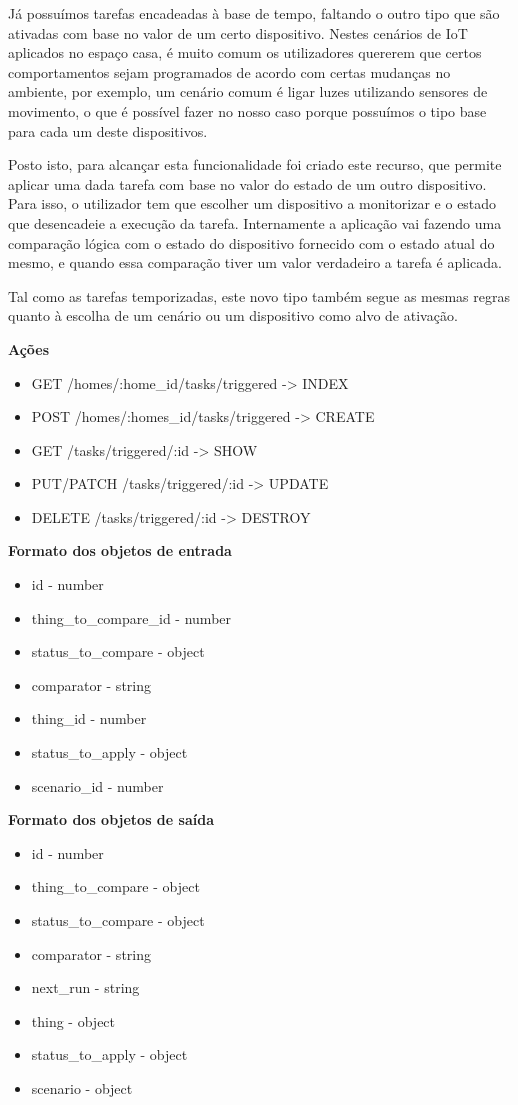 Já possuímos tarefas encadeadas à base de tempo, faltando o outro tipo que são ativadas com base no valor de um certo dispositivo. Nestes cenários de IoT aplicados no espaço casa, é muito comum os utilizadores quererem que certos comportamentos sejam programados de acordo com certas mudanças no ambiente, por exemplo, um cenário comum é ligar luzes utilizando sensores de movimento, o que é possível fazer no nosso caso porque possuímos o tipo base para cada um deste dispositivos.

Posto isto, para alcançar esta funcionalidade foi criado este recurso, que permite aplicar uma dada tarefa com base no valor do estado de um outro dispositivo. Para isso, o utilizador tem que escolher um dispositivo a monitorizar e o estado que desencadeie a execução da tarefa. Internamente a aplicação vai fazendo uma comparação lógica com o estado do dispositivo fornecido com o estado atual do mesmo, e quando essa comparação tiver um valor verdadeiro a tarefa é aplicada.

Tal como as tarefas temporizadas, este novo tipo também segue as mesmas regras quanto à escolha de um cenário ou um dispositivo como alvo de ativação.

\textbf{Ações}
\begin{itemize}
    \item GET /homes/:home{\_}id/tasks/triggered -> INDEX
    \item POST /homes/:homes{\_}id/tasks/triggered -> CREATE
    \item GET /tasks/triggered/:id -> SHOW
    \item PUT/PATCH /tasks/triggered/:id -> UPDATE
    \item DELETE /tasks/triggered/:id -> DESTROY
\end{itemize}

\textbf{Formato dos objetos de entrada}
\begin{itemize}
    \item id - number
    \item thing{\_}to{\_}compare{\_}id - number
    \item status{\_}to{\_}compare - object
    \item comparator - string
    \item thing{\_}id - number
    \item status{\_}to{\_}apply - object
    \item scenario{\_}id - number
\end{itemize}

\textbf{Formato dos objetos de saída}
\begin{itemize}
    \item id - number
    \item thing{\_}to{\_}compare - object
    \item status{\_}to{\_}compare - object
    \item comparator - string
    \item next{\_}run - string
    \item thing - object
    \item status{\_}to{\_}apply - object
    \item scenario - object
\end{itemize}

